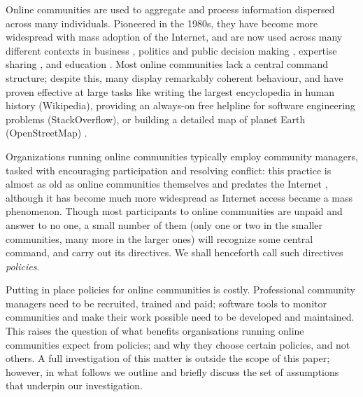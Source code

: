 \documentclass{nws}
\begin{document}
Online communities are used to aggregate and process information dispersed across many individuals.
Pioneered in the 1980s, they have become more widespread with mass adoption of the Internet, and are now used across many different contexts in business \cite{mcwilliam2012building, tapscott2008wikinomics},  politics and public decision making \cite{rheingold1993virtual, noveck2009wiki, cottica2010wikicrazia}, expertise sharing \cite{rheingold1993virtual, zhang2007expertise, shirky2008here}, and education \cite{milligan2013patterns}. Most online communities lack a central command structure; despite this, many display remarkably coherent behaviour, and have proven effective at large tasks like writing the largest encyclopedia in human history (Wikipedia), providing an always-on free helpline for software engineering problems (StackOverflow), or building a detailed map of planet Earth (OpenStreetMap) \cite{shirky2008here}. 

Organizations running online communities typically employ community managers, tasked with encouraging participation and resolving conflict: this practice is almost as old as online communities themselves and predates the Internet \cite{rheingold1993virtual}, although it has become much more widespread as Internet access became a mass phenomenon. Though most participants to online communities are unpaid and answer to no one, a small number of them (only one or two in the smaller communities, many more in the larger ones) will recognize some central command, and carry out its directives. We shall henceforth call such directives \emph{policies}. 

Putting in place policies for online communities is costly. Professional community managers need to be recruited, trained and paid; software tools to monitor communities and make their work possible need to be developed and maintained. This raises the question of what benefits organisations running online communities expect from policies; and why they choose certain policies, and not others. A full investigation of this matter is outside the scope of this paper; however, in what follows we outline and briefly discuss the set of assumptions that underpin our investigation. 
\end{document}
